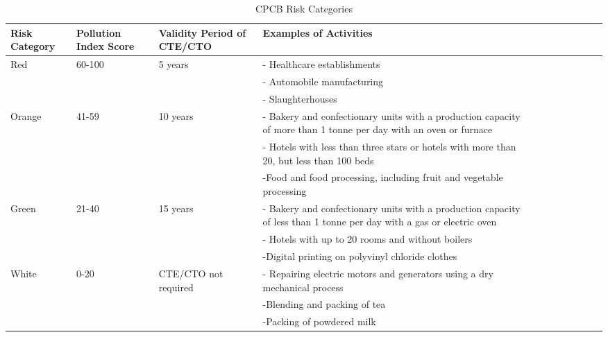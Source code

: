 \documentclass[a4paper, 12pt]{article}
\begin{document}
\begin{table}[htbp]
  \centering
  \caption{CPCB Risk Categories}
    \begin{tabular}{rrrlrrrrrrr}
  \multicolumn{1}{l}{\bfseries{Risk Category}} & \multicolumn{1}{l}{\bfseries{Pollution Index Score}} & \multicolumn{1}{l}{\bfseries{Validity Period of CTE/CTO}} & {\bfseries{Examples of Activities}} &       &       &       &       &       &       &  \\ \hline
    \multicolumn{1}{l}{Red} & \multicolumn{1}{l}{60-100} & \multicolumn{1}{l}{5 years} & - Healthcare establishments &       &       &       &       &       &       &  \\
          &       &       & - Automobile manufacturing &       &       &       &       &       &       &  \\
          &       &       & - Slaughterhouses &       &       &       &       &       &       &  \\
    \multicolumn{1}{l}{Orange} & \multicolumn{1}{l}{41-59} & \multicolumn{1}{l}{10 years} & - Bakery and confectionary units with a production capacity of more than 1 tonne per day with an oven or furnace &       &       &       &       &       &       &  \\
          &       &       & - Hotels with less than three stars or hotels with more than 20, but less than 100 beds &       &       &       &       &       &       &  \\
          &       &       & -Food and food processing, including fruit and vegetable processing &       &       &       &       &       &       &  \\
    \multicolumn{1}{l}{Green} & \multicolumn{1}{l}{21-40} & \multicolumn{1}{l}{15 years} & - Bakery and confectionary units with a production capacity of less than 1 tonne per day with a gas or electric oven &       &       &       &       &       &       &  \\
          &       &       & - Hotels with up to 20 rooms and without boilers &       &       &       &       &       &       &  \\
          &       &       & -Digital printing on polyvinyl chloride clothes &       &       &       &       &       &       &  \\
    \multicolumn{1}{l}{White} & \multicolumn{1}{l}{0-20} & \multicolumn{1}{l}{CTE/CTO not required} & - Repairing electric motors and generators using a dry mechanical process &       &       &       &       &       &       &  \\
          &       &       & -Blending and packing of tea &       &       &       &       &       &       &  \\
          &       &       & -Packing of powdered milk &       &       &       &       &       &       &  \                \end{tabular}%
  \label{tab:addlabel}%
\end{table}%
                 
\end{document}
